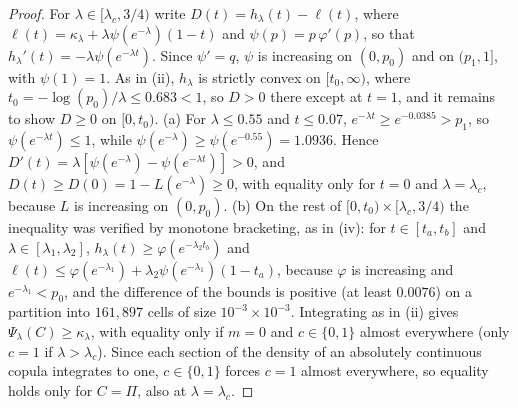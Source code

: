 \documentclass[11pt,a4paper]{article}
\theoremstyle{definition}
\theoremstyle{remark}
\begin{document}
\begin{proof}
For $\lambda\in[\lambda_c,3/4)$ write $D(t)=h_\lambda(t)-\ell(t)$, where $\ell(t)=\kappa_\lambda+\lambda\psi(e^{-\lambda})(1-t)$ and $\psi(p)=p\,\varphi'(p)$, so that $h_\lambda'(t)=-\lambda\psi(e^{-\lambda t})$. Since $\psi'=q$, $\psi$ is increasing on $(0,p_0)$ and on $(p_1,1]$, with $\psi(1)=1$. As in (ii), $h_\lambda$ is strictly convex on $[t_0,\infty)$, where $t_0=-\log(p_0)/\lambda\le0.683<1$, so $D>0$ there except at $t=1$, and it remains to show $D\ge0$ on $[0,t_0)$. (a) For $\lambda\le0.55$ and $t\le0.07$, $e^{-\lambda t}\ge e^{-0.0385}>p_1$, so $\psi(e^{-\lambda t})\le1$, while $\psi(e^{-\lambda})\ge\psi(e^{-0.55})=1.0936$. Hence $D'(t)=\lambda[\psi(e^{-\lambda})-\psi(e^{-\lambda t})]>0$, and $D(t)\ge D(0)=1-L(e^{-\lambda})\ge0$, with equality only for $t=0$ and $\lambda=\lambda_c$, because $L$ is increasing on $(0,p_0)$. (b) On the rest of $[0,t_0)\times[\lambda_c,3/4)$ the inequality was verified by monotone bracketing, as in (iv): for $t\in[t_a,t_b]$ and $\lambda\in[\lambda_1,\lambda_2]$, $h_\lambda(t)\ge\varphi(e^{-\lambda_2t_b})$ and $\ell(t)\le\varphi(e^{-\lambda_1})+\lambda_2\psi(e^{-\lambda_1})(1-t_a)$, because $\varphi$ is increasing and $e^{-\lambda_1}<p_0$, and the difference of the bounds is positive (at least $0.0076$) on a partition into $161{,}897$ cells of size $10^{-3}\times10^{-3}$. Integrating as in (ii) gives $\Psi_\lambda(C)\ge\kappa_\lambda$, with equality only if $m=0$ and $c\in\{0,1\}$ almost everywhere (only $c=1$ if $\lambda>\lambda_c$). Since each section of the density of an absolutely continuous copula integrates to one, $c\in\{0,1\}$ forces $c=1$ almost everywhere, so equality holds only for $C=\Pi$, also at $\lambda=\lambda_c$.


\end{proof}
\end{document}
